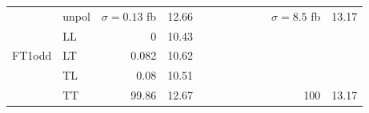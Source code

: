 \begin{table}[h]
{\begin{tabular}{llrrrrrrrrrr}
\midrule
\multirow{5}{*}{FT1odd}
 & unpol & $\sigma = \num{0.13}$ fb & \num{12.66} &  &  &  &  &  &  & $\sigma = \num{8.5}$ fb & \num{13.17} \\
 & LL & \num{0} & \num{10.43} &  &  &  &  &  &  &  &  \\
 & LT & \num{0.082} & \num{10.62} &  &  &  &  &  &  &  &  \\
 & TL & \num{0.08} & \num{10.51} &  &  &  &  &  &  &  &  \\
 & TT & \num{99.86} & \num{12.67} &  &  &  &  &  &  & \num{100} & \num{13.17} \\
\bottomrule
\end{tabular}
}%
\end{table}